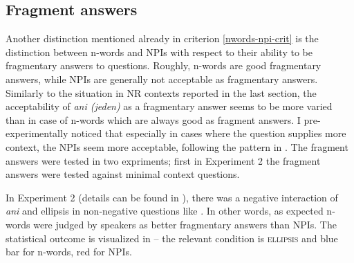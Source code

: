 \documentclass[output=paper,
]{langscibook}
\begin{document}
\subsection{Fragment answers}\label{fragment-answers}

Another distinction mentioned already in criterion \ref{nwords-npi-crit} is the distinction between n-words and NPIs with respect to their ability to be fragmentary answers to questions. Roughly, n-words are good fragmentary answers, while NPIs are generally not acceptable as fragmentary answers. Similarly to the situation in NR contexts reported in the last section, the acceptability of \textit{ani (jeden)} as a fragmentary answer seems to be more varied than in case of n-words which are always good as fragment answers. I pre-experimentally noticed that especially in cases where the question supplies more context, the NPIs seem more acceptable, following the pattern in . The fragment answers were tested in two expriments; first in Experiment 2 the fragment answers were tested against minimal context questions.

\ea \label{ex-32-5} 
\z
\z


\noindent In Experiment 2 (details can be found in \citealt{docekaldotlacilsubber}), there was a negative interaction of \textit{ani} and ellipsis in non-negative questions like . In other words, as expected n-words were judged by speakers as better fragmentary answers than NPIs. The statistical outcome is visualized in  -- the relevant condition is \textsc{ellipsis}  and blue bar for n-words, red for NPIs.

\z
\z
\end{document}
